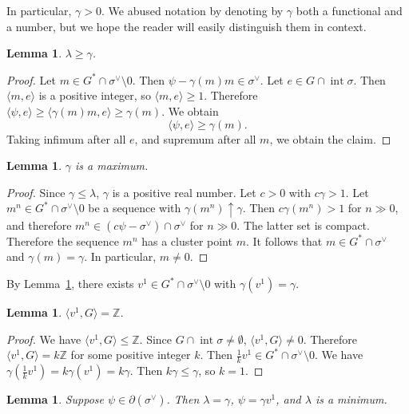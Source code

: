 \documentclass[12pt,reqno]{amsart}
\newcommand{\Z}{{\mathbb Z}}
\newcommand{\Int}{\operatorname{int}}
\theoremstyle{plain}
\newtheorem{lem}[thm]{Lemma}
\theoremstyle{definition}
\theoremstyle{remark}
\begin{document}
In particular, $\gamma>0$. We abused notation by denoting by $\gamma$ both a functional and a number,
but we hope the reader will easily distinguish them in context. 

\begin{lem}
$\lambda\ge \gamma$.
\end{lem}

\begin{proof}
Let $m\in G^*\cap \sigma^\vee\setminus 0$. Then $\psi-\gamma(m)m\in \sigma^\vee$.
Let $e\in G\cap \Int \sigma$. Then $\langle m,e\rangle$ is a positive integer, so $\langle m,e\rangle\ge 1$. Therefore 
$\langle \psi,e\rangle\ge \langle\gamma(m)m,e\rangle\ge \gamma(m)$. We 
obtain
$$
\langle \psi,e\rangle\ge \gamma(m).
$$
Taking infimum after all $e$, and supremum after all $m$, we obtain
the claim.
\end{proof}

\begin{lem}\label{gmax}
$\gamma$ is a maximum.
\end{lem}

\begin{proof} Since $\gamma\le \lambda$, $\gamma$ is a 
positive real number. Let $c>0$ with $c\gamma>1$.
Let $m^n\in G^*\cap \sigma^\vee\setminus 0$ be a sequence with
$\gamma(m^n)\uparrow \gamma$.
Then $c\gamma(m^n)>1$ for $n\gg 0$, and therefore 
$m^n\in (c\psi-\sigma^\vee)\cap \sigma^\vee$ for $n\gg 0$. 
The latter set is compact.
Therefore the sequence $m^n$ has a cluster point $m$. It follows that 
$m\in G^*\cap \sigma^\vee$ and $\gamma(m)=\gamma$. In particular, $m\ne 0$.
\end{proof}

By Lemma~\ref{gmax}, there exists $v^1\in G^*\cap \sigma^\vee\setminus 0$ 
with $\gamma(v^1)=\gamma$. 

\begin{lem}
$\langle v^1,G\rangle= \Z$.
\end{lem}

\begin{proof}
We have $\langle v^1,G\rangle\le \Z$.
Since $G\cap \Int \sigma \ne \emptyset$, $\langle v^1,G\rangle\ne 0$.
Therefore $\langle v^1,G\rangle=k\Z$ for some positive integer $k$. 
Then $\frac{1}{k}v^1\in G^*\cap \sigma^\vee \setminus 0$. We
have $\gamma(\frac{1}{k}v^1)=k\gamma(v^1)=k\gamma$. Then $k\gamma\le \gamma$,
so $k=1$.
\end{proof}

\begin{lem}
Suppose $\psi\in \partial(\sigma^\vee)$. Then $\lambda=\gamma$,
$\psi=\gamma v^1$, and $\lambda$ is a minimum.
\end{lem}
\end{document}
